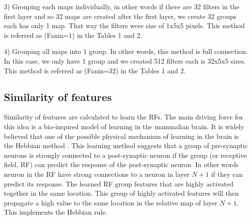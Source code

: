 \documentclass{article} %
\begin{document}
3) Grouping each maps individually, in other words if there are 32 filters in the first layer and so 32 maps are created after the first layer, we create 32 groups each has only 1 map. That way the filters were size of 1x5x5 pixels. This method is  referred as  (Fanin=1) in the Tables 1 and 2.

4) Grouping all maps into 1 group. In other words, this method is full connection. In this case, we only have 1 group and we created 512 filters each is 32x5x5 sizes. This method is  referred as  (Fanin=32) in the Tables 1 and 2.





\subsection{Similarity of features}
Similarity of features are calculated to learn the RFs. The main driving force for this idea is a bio-inspired model of learning in the mammalian brain. It is widely believed that one of the possible physical mechanism of learning in the brain is the Hebbian method \cite{masquelier2007learning}. This learning method suggests that a group of pre-synaptic neurons is strongly connected to a post-synaptic neuron if the group (or receptive field, RF) can predict the response of the post-synaptic neuron. In other words neuron in the RF have strong connections to a neuron in layer $N+1$ if they can predict its response. The learned RF group features that are highly activated together in the same location. This group of highly activated features will then propagate a high value to the same location in the relative map of layer $N+1$. This implements the Hebbian rule. 



\end{document}
